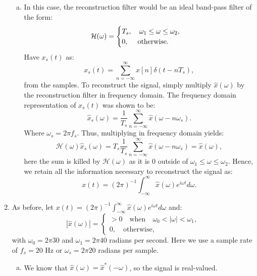 \begin{enumerate}
\begin{enumerate}[a)]
\item In this case, the reconstruction filter would be an ideal band-pass filter of the form:
$$\mathcal{H}(\omega)=\begin{cases}
    T_{s}, \quad \omega_{1}\le\omega\le\omega_{2}, \\
    0, \quad \hspace{0.1cm}\text{otherwise}.
\end{cases}$$
Have $x_{s}(t)$ as:
$$x_{s}(t)=\sum_{n=-\infty}^{\infty}x[n]\delta(t-nT_{s}),$$
from the samples. To reconstruct the signal, simply multiply $\hat{x}(\omega)$ by the reconstruction filter in frequency domain. The frequency domain representation of $x_{s}(t)$ was shown to be:
$$\hat{x}_{s}(\omega)=\frac{1}{T_{s}}\sum_{n=-\infty}^{\infty}\hat{x}(\omega-n\omega_{s}).$$
Where $\omega_{s}=2\pi f_{s}$. Thus, multiplying in frequency domain yields:
$$\mathcal{H}(\omega)\hat{x}_{s}(\omega)=T_{s}\frac{1}{T_{s}}\sum_{n=-\infty}^{\infty}\hat{x}(\omega-n\omega_{s})=\hat{x}(\omega),$$
here the sum is killed by $\mathcal{H}(\omega)$ as it is $0$ outside of $\omega_{1}\le\omega\le\omega_{2}$. Hence, we retain all the information necessary to reconstruct the signal as: 
$$x(t)=(2\pi)^{-1}\int_{-\infty}^{\infty}\hat{x}(\omega)e^{i\omega t}d\omega.$$
\end{enumerate}



\item As before, let $x(t)=(2\pi)^{-1}\int_{-\infty}^{\infty}\hat{x}(\omega)e^{i\omega t}d\omega$ and:
$$|\hat{x}(\omega)|=\begin{cases}
    > 0 \quad    \text{when} \quad \omega_{0}<|\omega|<\omega_{1},\\
    0, \quad     \text{otherwise},
\end{cases}$$
with $\omega_{0}=2\pi30$ and $\omega_{1}=2\pi40$ radians per second. Here we use a sample rate of $f_{s}=20$ Hz or $\omega_{s}=2\pi 20$ radians per sample. 

\begin{enumerate}[a)]
\item We know that $\hat{x}(\omega)=\hat{x}^{*}(-\omega)$, so the signal is real-valued. 


\end{enumerate}
\end{enumerate}
